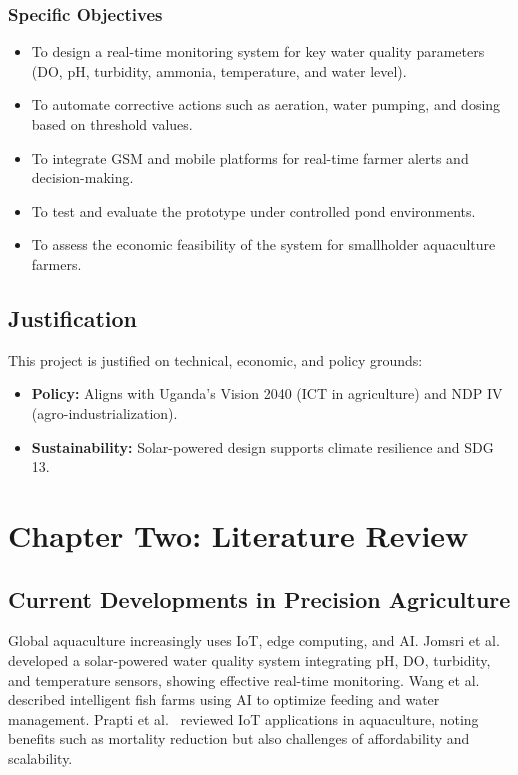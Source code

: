 \documentclass[12pt,a4paper]{report}
\begin{document}
\subsection*{Specific Objectives}
\begin{itemize}
    \item To design a real-time monitoring system for key water quality parameters (DO, pH, turbidity, ammonia, temperature, and water level).
    \item To automate corrective actions such as aeration, water pumping, and dosing based on threshold values.
    \item To integrate GSM and mobile platforms for real-time farmer alerts and decision-making.
    \item To test and evaluate the prototype under controlled pond environments.
    \item To assess the economic feasibility of the system for smallholder aquaculture farmers.
\end{itemize}

\section{Justification}
This project is justified on technical, economic, and policy grounds:
\begin{itemize}
inspection~\cite{prapti2022internet}.
markets~\cite{byabasaija2025unlocking}.
    \item \textbf{Policy:} Aligns with Uganda’s Vision 2040 (ICT in agriculture) and NDP IV (agro-industrialization).
    \item \textbf{Sustainability:} Solar-powered design supports climate resilience and SDG 13.
\end{itemize}

\chapter{Chapter Two: Literature Review}
\section{Current Developments in Precision Agriculture}
Global aquaculture increasingly uses IoT, edge computing, and AI. Jomsri et al.~\cite{jomsri2024prototype} developed a solar-powered water quality system integrating pH, DO, turbidity, and temperature sensors, showing effective real-time monitoring. Wang et al.~\cite{wang2021intelligent} described intelligent fish farms using AI to optimize feeding and water management. Prapti et al.~\cite{prapti2022internet} reviewed IoT applications in aquaculture, noting benefits such as mortality reduction but also challenges of affordability and scalability.  
\end{document}
